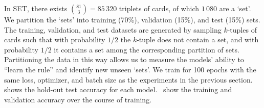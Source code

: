 
In SET, there exists $\binom{81}{3} = 85\,320$ triplets of cards, of which $1\,080$ are a `set'. We partition the `sets' into training (70\%), validation (15\%), and test (15\%) sets. The training, validation, and test datasets are generated by sampling $k$-tuples of cards such that with probability $1/2$ the $k$-tuple does not contain a set, and with probability $1/2$ it contains a set among the corresponding partition of sets. Partitioning the data in this way allows us to measure the models' ability to ``learn the rule'' and identify new unseen `sets'. We train for 100 epochs with the same loss, optimizer, and batch size as the experiments in the previous section.~ shows the hold-out test accuracy for each model.~ show the training and validation accuracy over the course of training.

